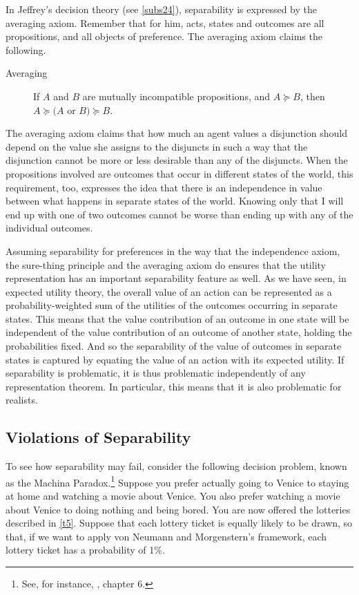 In Jeffrey's decision theory (see \autoref{subs24}), separability is expressed by the averaging axiom. Remember that for him, acts, states and outcomes are all propositions, and all objects of preference. The averaging axiom claims the following.
\begin{description}
\item[Averaging] If $A$ and $B$ are mutually incompatible propositions, and $A \succcurlyeq B$, then $A \succcurlyeq (A$ or $B) \succcurlyeq B$.
\end{description}
The averaging axiom claims that how much an agent values a disjunction should depend on the value she assigns to the disjuncts in such a way that the disjunction cannot be more or less desirable than any of the disjuncts. When the propositions involved are outcomes that occur in different states of the world, this requirement, too, expresses the idea that there is an independence in value between what happens in separate states of the world. Knowing only that I will end up with one of two outcomes cannot be worse than ending up with any of the individual outcomes.

Assuming separability for preferences in the way that the independence axiom, the sure-thing principle and the averaging axiom do ensures that the utility representation has an important separability feature as well. As we have seen, in expected utility theory, the overall value of an action can be represented as a probability-weighted sum of the utilities of the outcomes occurring in separate states. This means that the value contribution of an outcome in one state will be independent of the value contribution of an outcome of another state, holding the probabilities fixed. And so the separability of the value of outcomes in separate states is captured by equating the value of an action with its expected utility. If separability is problematic, it is thus problematic independently of any representation theorem. In particular, this means that it is also problematic for realists.

\subsection{Violations of Separability}\label{subs52}

To see how separability may fail, consider the following decision problem, known as the Machina Paradox.\footnote{See, for instance, \citet{Mas-Colell1995}, chapter 6.} Suppose you prefer actually going to Venice to staying at home and watching a movie about Venice. You also prefer watching a movie about Venice to doing nothing and being bored. You are now offered the lotteries described in \autoref{t5}. Suppose that each lottery ticket is equally likely to be drawn, so that, if we want to apply von Neumann and Morgenstern's framework, each lottery ticket has a probability of 1\%.

